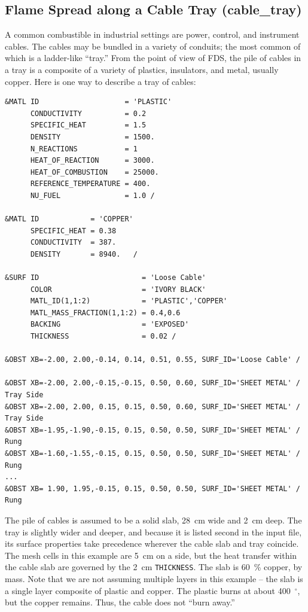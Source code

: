 \documentclass[11pt]{book}
\newcommand{\ct}{\tt\small}
\begin{document}
\clearpage
\subsection{Flame Spread along a Cable Tray ({\bf cable\_tray}) }
\label{cable_tray}

A common combustible in industrial settings are power, control, and instrument cables. The cables may be bundled in a variety of conduits; the most
common of which is a ladder-like ``tray.'' From the point of view of FDS, the pile of cables in a tray is a composite of a variety of plastics, insulators,
and metal, usually copper. Here is one way to describe a tray of cables:

\footnotesize
\begin{verbatim}
&MATL ID                    = 'PLASTIC'
      CONDUCTIVITY          = 0.2
      SPECIFIC_HEAT         = 1.5
      DENSITY               = 1500.
      N_REACTIONS           = 1
      HEAT_OF_REACTION      = 3000.
      HEAT_OF_COMBUSTION    = 25000.
      REFERENCE_TEMPERATURE = 400.
      NU_FUEL               = 1.0 /

&MATL ID            = 'COPPER'
      SPECIFIC_HEAT = 0.38
      CONDUCTIVITY  = 387.
      DENSITY       = 8940.   /

&SURF ID                        = 'Loose Cable'
      COLOR                     = 'IVORY BLACK'
      MATL_ID(1,1:2)            = 'PLASTIC','COPPER'
      MATL_MASS_FRACTION(1,1:2) = 0.4,0.6
      BACKING                   = 'EXPOSED'
      THICKNESS                 = 0.02 /

&OBST XB=-2.00, 2.00,-0.14, 0.14, 0.51, 0.55, SURF_ID='Loose Cable' /

&OBST XB=-2.00, 2.00,-0.15,-0.15, 0.50, 0.60, SURF_ID='SHEET METAL' / Tray Side
&OBST XB=-2.00, 2.00, 0.15, 0.15, 0.50, 0.60, SURF_ID='SHEET METAL' / Tray Side
&OBST XB=-1.95,-1.90,-0.15, 0.15, 0.50, 0.50, SURF_ID='SHEET METAL' / Rung
&OBST XB=-1.60,-1.55,-0.15, 0.15, 0.50, 0.50, SURF_ID='SHEET METAL' / Rung
...
&OBST XB= 1.90, 1.95,-0.15, 0.15, 0.50, 0.50, SURF_ID='SHEET METAL' / Rung
\end{verbatim} \normalsize

\noindent
The pile of cables is assumed to be a solid slab, 28~cm wide and 2~cm deep. The tray is slightly wider and deeper, and because it is listed second in
the input file, its surface properties take precedence wherever the cable slab and tray coincide. The mesh cells in this example are 5~cm on a side, but the
heat transfer within the cable slab are governed by the 2~cm {\ct THICKNESS}. The slab is 60~\% copper, by mass. Note that we are not assuming multiple
layers in this example -- the slab is a single layer composite of plastic and copper. The plastic burns at about 400~$^\circ$, but the copper remains. Thus,
the cable does not ``burn away.''
\end{document}
